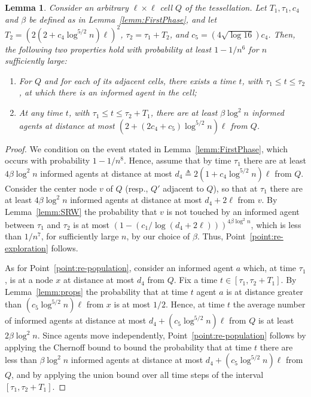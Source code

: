 \documentclass[11pt]{article}
\newtheorem{lemm}{Lemma}
\begin{document}
\begin{lemm}
\label{lemm:SecondPhase}
Consider an arbitrary $\ell \times \ell$ cell $Q$ of the tessellation.
Let $T_1, \tau_1, c_4$ and $\beta$ be defined as in
Lemma~\ref{lemm:FirstPhase}, and let
$T_2 = (2(2 + c_4 \log^{5/2} n)\ell)^2 $,
$\tau_2 = \tau_1 + T_2$,
and $c_5 = (4 \sqrt{\log 16}) c_4$.
Then, the following two properties hold with probability
at least $1-1/n^6$ for $n$ sufficiently large:
\begin{enumerate}
\item\label{point:re-exploration}
For $Q$ and for each of its adjacent cells,
there exists a time $t$, with $\tau_1 \leq t \leq \tau_2$,
at which there is an informed agent in the cell;
\item\label{point:re-population}
At any time $t$, with $\tau_1 \leq t \leq \tau_2 + T_1$, there are
at least $\beta \log^2 n$ informed agents at distance
at most $(2 + (2c_4 + c_5) \log^{5/2} n) \ell$ from $Q$.
\end{enumerate}
\end{lemm}
\begin{proof}
We condition on the event stated in Lemma~\ref{lemm:FirstPhase},
which occurs with probability $1-1/n^8$.
Hence, assume that by time $\tau_1$ there
are at least $4\beta \log^2 n$ informed agents at distance
at most $d_4 \triangleq 2 (1 + c_4 \log^{5/2} n) \ell$ from $Q$.
Consider the center node $v$ of $Q$ (resp., $Q'$ adjacent to $Q$),
so that at $\tau_1$ there are at least $4\beta \log^2 n$
informed agents at distance at most $d_4 + 2\ell$ from $v$.
By Lemma~\ref{lemm:SRW} the probability that $v$ is not touched by an
informed agent between $\tau_1$ and $\tau_2$ is at most
$\left(1-(c_1/\log (d_4 + 2\ell))\right)^{4\beta \log^2 n}$,
which is less than $1/n^7$, for sufficiently large $n$,
by our choice of $\beta$.
Thus, Point~\ref{point:re-exploration} follows.

As for Point~\ref{point:re-population}, consider an informed agent $a$ which,
at time $\tau_1$, is at a node $x$ at distance
at most $d_4$ from $Q$.
Fix a time $t \in [\tau_1, \tau_2 + T_1]$.
By Lemma~\ref{lemm:props} the probability that at time $t$ agent $a$ is
at distance greater than $(c_5 \log^{5/2} n) \ell$ from $x$ is at most $1/2$.
Hence, at time $t$ the average number of informed agents at distance
at most $d_4 + (c_5 \log^{5/2} n) \ell$ from $Q$ is at least $2\beta \log^2 n$.
Since agents move independently,
Point~\ref{point:re-population} follows by applying the
Chernoff bound to bound the probability that at time $t$ there are
less than $\beta \log^2 n$ informed agents at distance
at most $d_4 + (c_5 \log^{5/2} n) \ell$ from $Q$, and by applying the union bound
over all time steps of the interval $[\tau_1, \tau_2 + T_1]$.
\end{proof}
\end{document}

